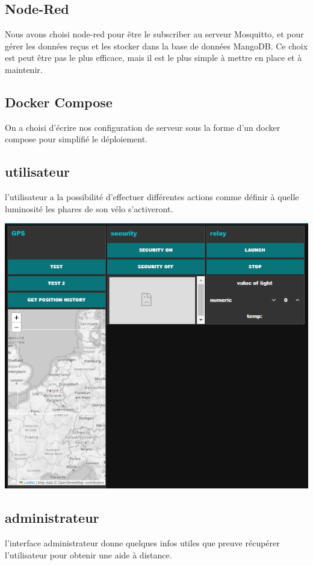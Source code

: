 \subsection{Node-Red}
Nous avons choisi node-red pour être le subscriber au serveur Mosquitto, et pour gérer les données reçus et les stocker dans la base de données MangoDB. Ce choix est peut être pas le plus efficace, mais il est le plus simple à mettre en place et à maintenir.
\subsection{Docker Compose}
On a choisi d'écrire nos configuration de serveur sous la forme d'un docker compose pour simplifié le déploiement.




\subsection{utilisateur}
 l'utilisateur a la possibilité d'effectuer différentes actions comme définir à quelle luminosité les phares de son vélo s'activeront. 
 \begin{center}
\includegraphics{Rapport/media/images/info.png}{\centering}
\end{center}
\subsection{administrateur}
 l'interface administrateur donne quelques infos utiles que preuve récupérer l'utilisateur pour obtenir une aide à distance.

